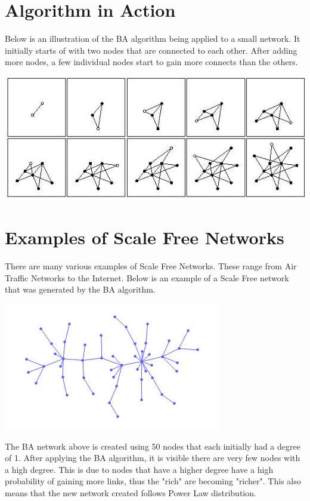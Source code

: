 \documentclass[a0,final]{a0poster}
\begin{document}
\begin{multicols}{3}
\columnbreak




\section*{Algorithm in Action}
Below is an illustration of the BA algorithm being applied to a small network.
It initially starts of with two nodes that are connected to each other. After adding more nodes, a few individual nodes start to gain more connects than the others.\\
\centerline{\includegraphics[width=30cm]{growth.jpg}}

\section*{Examples of Scale Free Networks}

There are many various examples of Scale Free Networks. These range from Air Traffic Networks to the Internet. Below is an example of a Scale Free network that was generated by the BA algorithm.
\newline
{\centering
\centerline{\includegraphics[scale=1.5]{BA.jpg}}}
\newline
The BA network above is created using 50 nodes that each initially had a degree of 1.
After applying the BA algorithm, it is visible there are very few nodes with a high degree. This is due to nodes that have a higher degree have a high probability of gaining more links, thus the "rich" are becoming "richer". This also means that the new network created follows Power Law distribution.
\newline


\end{multicols}
\end{document}
